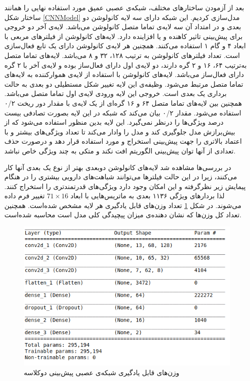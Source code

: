 بعد از آزمودن ساختارهای مختلف، شبکه‌ی عصبی عمیق مورد استفاده نهایی را همانند ساختار شکل
\ref{CNNModel}
مدل‌سازی کردیم. این شبکه دارای سه لایه کانولوشن دو بعدی و در امتداد آن سه لایه‌ی تماما متصل کانولوشن می‌باشد. لایه‌ی آخر دو خروجی برای پیش‌بینی تاثیر کاهنده و یا افزاینده دارد. لایه‌های‌ کانولوشن از فیلترهای مربعی با ابعاد ۴ و گام
۱ استفاده می‌کنند. همچنین هر لایه‌ی کانولوشن دارای یک تابع فعال‌سازی
است. تعداد فیلترهای کانولوشن به ترتیب ۱۲۸، ۳۲ و ۸ می‌باشد. لایه‌های تماما متصل به‌ترتیب ۶۴، ۱۶ و ۲ گره دارند، دو لایه‌ی اول دارای فعال‌ساز
بوده و لایه‌ی آخر با ۲ گره دارای فعال‌ساز 
می‌باشد. لایه‌های کانولوشن با استفاده از لایه‌ی هموارکننده
به لایه‌های تماما متصل مرتبط می‌شود. وظیفه‌ی این لایه تغییر شکل مستطیلی دو بعدی به حالت برداری یک بعدی است. خروجی این لایه ورودی لایه‌ی اول تماما متصل می‌باشد. همچنین بین لایه‌های تماما متصل ۶۴ و ۱۶ گره‌ای از یک لایه‌ی
با مقدار دور ریخت ۰/۲ استفاده می‌شود.  مقدار ۰/۲ بیان می‌کند که شبکه در این لایه بصورت تصادفی بیست درصد ویژگی‌ها را درنظر نمی‌گیرد. این لایه بدین منظور استفاده می‌شود که از بیش‌برازش
مدل جلوگیری کند و مدل را وادار می‌کند تا تعداد ویژگی‌های بیشتر و با اعتماد بالاتری را جهت پیش‌بینی استخراج و مورد استفاده قرار دهد و درصورت حذف تعدادی از آنها توان پیش‌بینی الگوریتم افت نکند و متکی به چند ویژگی خاص نباشد.
 
در بررسی‌ها مشاهده شد لایه‌های کانولوشن دوبعدی بهتر از نوع یک بعدی آنها کار می‌کنند، زیرا در این حالت فیلترها ‌می‌توانند شباهت‌های دارویی بیشتری را در هنگام پیمایش زیر نظرگرفته و این امکان وجود دارد ویژگی‌های قدرتمندتری را استخراج کنند. لذا بردارهای ویژگی ۱۱۳۶ بعدی به ماتریس‌هایی با ابعاد
$71 \times 16$
تغییر فرم داده می‌شوند. در شکل
\ref{paramNumber1}
تعداد وزن‌های قابل یادگیری هر لایه مشخص شده‌است. همچنین تعداد کل وزن‌ها که نشان دهنده‌ی میزان پیچیدگی کلی مدل است محاسبه شده‌است.

\begin{figure}[!h]
	\centering
	\includegraphics[width=\textwidth]{section3/modelparameters.png}
	\caption{
وزن‌های قابل یادگیری شبکه‌ی عصبی پیش‌بینی دوکلاسه}
	\label{paramNumber1}
\end{figure}

